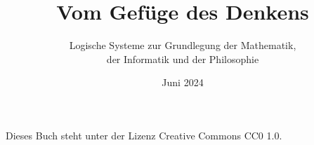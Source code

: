 \documentclass[paper=186mm:234mm,pagesize=auto,fleqn,11pt,dvipdfmx]{scrbook}
\title{Vom Gefüge des Denkens}
\subtitle{Logische Systeme zur Grundlegung der Mathematik,\\
der Informatik und der Philosophie}
\date{Juni 2024}
\theoremstyle{rmbox}
\numberwithin{Definition}{chapter}
\numberwithin{Satz}{chapter}
\begin{document}
\renewcommand{\thepage}{C\arabic{page}}


\newpage
\thispagestyle{empty}
\mbox{}

\newpage
\addtocounter{page}{-2}
\renewcommand{\thepage}{\arabic{page}}
\thispagestyle{empty}

\maketitle


\noindent
Dieses Buch steht unter der Lizenz Creative Commons CC0 1.0.

\tableofcontents















\printindex
\end{document}
